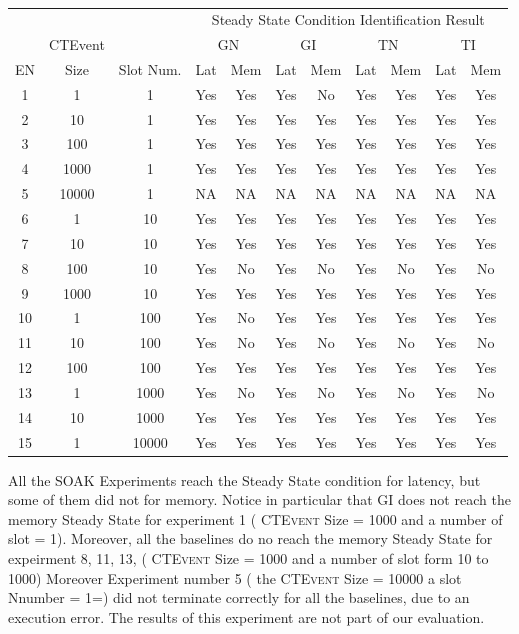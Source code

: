 \begin{table}[htb]
\centering
\scriptsize
 \begin{tabular}{c|c|c|cc|cc|cc|cc}
	  	\hline
	  	&&&\multicolumn{8}{c}{Steady State Condition Identification Result}  \\
	  	&CTEvent&&\multicolumn{2}{c}{GN}|&\multicolumn{2}{c}{GI}|&\multicolumn{2}{c}{TN}|&\multicolumn{2}{c}{TI}  \\
	  	EN&Size& Slot Num.&Lat&Mem&Lat&Mem&Lat&Mem&Lat&Mem  \\
		\hline
		\hline
		 1&1&1&Yes&Yes&Yes&No&Yes&Yes&Yes&Yes\\
		 2&10&1&Yes&Yes&Yes&Yes&Yes&Yes&Yes&Yes\\
		 3&100&1&Yes&Yes&Yes&Yes&Yes&Yes&Yes&Yes\\
		 4&1000&1&Yes&Yes&Yes&Yes&Yes&Yes&Yes&Yes\\
		 5&10000&1&NA&NA&NA&NA&NA&NA&NA&NA\\
		 6&1&10&Yes&Yes&Yes&Yes&Yes&Yes&Yes&Yes\\
		 7&10&10&Yes&Yes&Yes&Yes&Yes&Yes&Yes&Yes\\
		 8&100&10&Yes&No&Yes&No&Yes&No&Yes&No\\
		 9&1000&10&Yes&Yes&Yes&Yes&Yes&Yes&Yes&Yes\\
		 10&1&100&Yes&No&Yes&Yes&Yes&Yes&Yes&Yes\\
		 11&10&100&Yes&No&Yes&No&Yes&No&Yes&No\\
		 12&100&100&Yes&Yes&Yes&Yes&Yes&Yes&Yes&Yes\\
		 13&1&1000&Yes&No&Yes&No&Yes&No&Yes&No\\
		 14&10&1000&Yes&Yes&Yes&Yes&Yes&Yes&Yes&Yes\\
		 15&1&10000&Yes&Yes&Yes&Yes&Yes&Yes&Yes&Yes\\

		\hline 
 \end{tabular}
 \caption{}
\label{tab:ss-cond}
\end{table}

All the SOAK Experiments reach the Steady State condition for latency, but some of them did not for memory. Notice in particular that GI does not reach the memory Steady State for experiment 1 (  \textsc{CTEvent}  Size = 1000 and a number of slot = 1). Moreover, all the baselines do no reach the memory  Steady State for expeirment 8, 11, 13, ( \textsc{CTEvent}  Size = 1000 and a number of slot form 10 to 1000)  Moreover Experiment number 5 ( the \textsc{CTEvent} Size = 10000 a slot Nnumber = 1=) did not terminate correctly for all the baselines, due to an execution error. The results of this experiment are not part of our evaluation.

